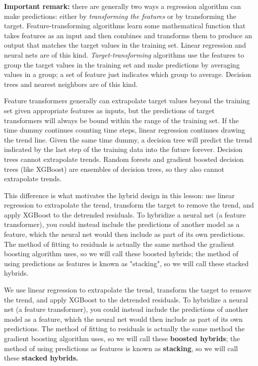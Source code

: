 \documentclass[12pt]{report}
\begin{document}
\textbf{Important remark:} there are generally two ways a regression algorithm can make predictions: either by \textit{transforming the features} or by transforming the target. Feature-transforming algorithms learn some mathematical function that takes features as an input and then combines and transforms them to produce an output that matches the target values in the training set. Linear regression and neural nets are of this kind. \textit{Target-transforming} algorithms use the features to group the target values in the training set and make predictions by averaging values in a group; a set of feature just indicates which group to average. Decision trees and nearest neighbors are of this kind.


Feature transformers generally can extrapolate target values beyond the training set given appropriate features as inputs, but the predictions of target transformers will always be bound within the range of the training set. If the time dummy continues counting time steps, linear regression continues drawing the trend line. Given the same time dummy, a decision tree will predict the trend indicated by the last step of the training data into the future forever. Decision trees cannot extrapolate trends. Random forests and gradient boosted decision trees (like XGBoost) are ensembles of decision trees, so they also cannot extrapolate trends.

This difference is what motivates the hybrid design in this lesson: use linear regression to extrapolate the trend, transform the target to remove the trend, and apply XGBoost to the detrended residuals. To hybridize a neural net (a feature transformer), you could instead include the predictions of another model as a feature, which the neural net would then include as part of its own predictions. The method of fitting to residuals is actually the same method the gradient boosting algorithm uses, so we will call these boosted hybrids; the method of using predictions as features is known as "stacking", so we will call these stacked hybrids.


We use linear regression to extrapolate the trend, transform the target to remove the trend, and apply XGBoost to the detrended residuals. To hybridize a neural net (a feature transformer), you could instead include the predictions of another model as a feature, which the neural net would then include as part of its own predictions. The method of fitting to residuals is actually the same method the gradient boosting algorithm uses, so we will call these \textbf{boosted hybrids}; the method of using predictions as features is known as \textbf{stacking}, so we will call these \textbf{stacked hybrids.}
\end{document}

